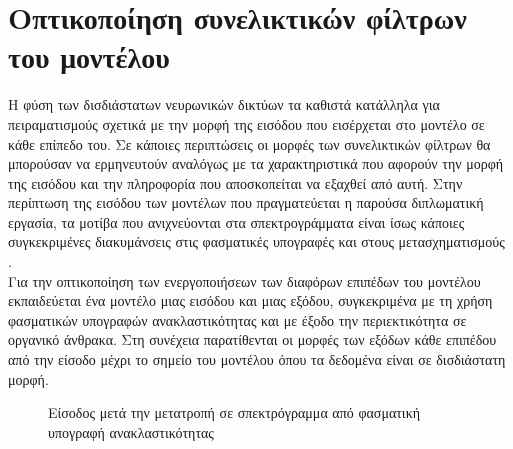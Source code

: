 \section{Οπτικοποίηση συνελικτικών φίλτρων του μοντέλου}
Η φύση των δισδιάστατων νευρωνικών δικτύων τα καθιστά κατάλληλα για πειραματισμούς σχετικά με την μορφή της εισόδου που εισέρχεται στο μοντέλο σε κάθε επίπεδο του. Σε κάποιες περιπτώσεις οι μορφές των συνελικτικών φίλτρων θα μπορούσαν να ερμηνευτούν αναλόγως με τα χαρακτηριστικά που αφορούν την μορφή της εισόδου και την πληροφορία που αποσκοπείται να εξαχθεί από αυτή. Στην περίπτωση της εισόδου των μοντέλων που πραγματεύεται η παρούσα διπλωματική εργασία, τα μοτίβα που ανιχνεύονται στα σπεκτρογράμματα είναι ίσως κάποιες συγκεκριμένες διακυμάνσεις στις φασματικές υπογραφές και στους μετασχηματισμούς .\\

Για την οπτικοποίηση των ενεργοποιήσεων των διαφόρων επιπέδων του μοντέλου εκπαιδεύεται ένα μοντέλο μιας εισόδου και μιας εξόδου, συγκεκριμένα  με τη χρήση φασματικών υπογραφών ανακλαστικότητας και με έξοδο την περιεκτικότητα σε οργανικό άνθρακα. Στη συνέχεια παρατίθενται οι μορφές των εξόδων κάθε επιπέδου από την είσοδο μέχρι το σημείο του μοντέλου όπου τα δεδομένα είναι σε δισδιάστατη μορφή.

\begin{figure}[H]
  \begin{center}
    
    \caption{Είσοδος μετά την μετατροπή σε σπεκτρόγραμμα από φασματική υπογραφή ανακλαστικότητας}
  \end{center}
\end{figure}

%
%    


